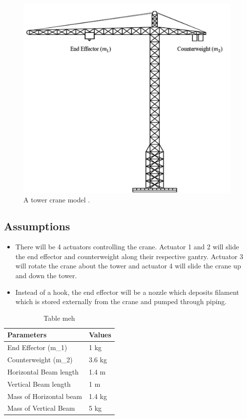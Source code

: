 \documentclass{UoNMCHA}
\numberwithin{equation}{section}
\begin{document}
	\begin{figure}[H]
		\begin{center}
			\includegraphics[width=.8\linewidth]{figs/Picture5}
			\caption{A tower crane model \cite{crane}.}
			\label{figs/Picture5}
		\end{center}
	\end{figure}
	
	\subsection*{Assumptions}
	\begin{itemize}
		\item There will be 4 actuators controlling the crane. Actuator 1 and 2 will slide the end effector and counterweight along their respective gantry. Actuator 3 will rotate the crane about the tower and actuator 4 will slide the crane up and down the tower. 
		\item Instead of a hook, the end effector will be a nozzle which deposits filament which is stored externally from the crane and pumped through piping.
		
	\end{itemize}
	
	
	\begin{table}[H] \centering 
		\caption{Table meh}
		\begin{tabular}{ll}
			\hline
			Parameters              & Values \\ \hline 
			End Effector (m\_1)     & 1 kg   \\ 
			Counterweight (m\_2)    & 3.6 kg \\ 
			Horizontal Beam length  & 1.4 m  \\ 
			Vertical Beam length    & 1 m    \\ 
			Mass of Horizontal beam & 1.4 kg \\ 
			Mass of Vertical Beam   & 5 kg  
		\end{tabular}
		\label{tab:physical param}
	\end{table}
	
\end{document}
